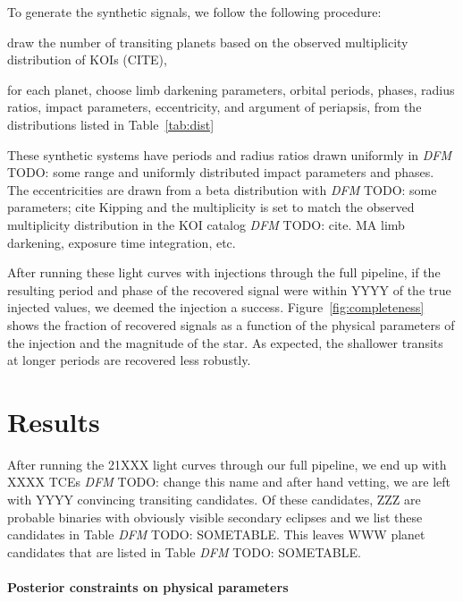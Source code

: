 \documentclass[12pt,preprint]{aastex}
\newcommand{\figref}[1]{\ref{fig:#1}}
\newcommand{\Fig}[1]{Figure~\figref{#1}}
\newcommand{\Tab}[1]{Table~\ref{tab:#1}}
\newcommand{\tab}[1]{\Tab{#1}}
\newcommand{\sectlabel}[1]{\label{sect:#1}}
\newcommand{\todo}[3]{{\color{#2} \emph{#1} TODO: #3}}
\newcommand{\dfmtodo}[1]{\todo{DFM}{red}{#1}}
\begin{document}
To generate the synthetic signals, we follow the following procedure:
\begin{enumerate}

{\item draw the number of transiting planets based on the observed
multiplicity distribution of KOIs (CITE),}

{\item for each planet, choose limb darkening parameters, orbital periods,
phases, radius ratios, impact parameters, eccentricity, and argument of
periapsis, from the distributions listed in \tab{dist}}

\end{enumerate}


These synthetic systems have periods and radius ratios drawn uniformly in
\dfmtodo{some range} and uniformly distributed impact parameters and phases.
The eccentricities are drawn from a beta distribution with \dfmtodo{some
parameters; cite Kipping} and the multiplicity is set to match the observed
multiplicity distribution in the KOI catalog \dfmtodo{cite}.
MA limb darkening, exposure time integration, etc.

After running these light curves with injections through the full pipeline, if
the resulting period and phase of the recovered signal were within YYYY of the
true injected values, we deemed the injection a success.
\Fig{completeness} shows the fraction of recovered signals as a function of the
physical parameters of the injection and the magnitude of the star.
As expected, the shallower transits at longer periods are recovered less
robustly.



\section{Results}
\sectlabel{results}

After running the 21XXX light curves through our full pipeline, we end up
with XXXX TCEs \dfmtodo{change this name} and after hand vetting, we are left
with YYYY convincing transiting candidates.
Of these candidates, ZZZ are probable binaries with obviously visible
secondary eclipses and we list these candidates in Table \dfmtodo{SOMETABLE}.
This leaves WWW planet candidates that are listed in Table
\dfmtodo{SOMETABLE}.

\paragraph{Posterior constraints on physical parameters}
\end{document}
